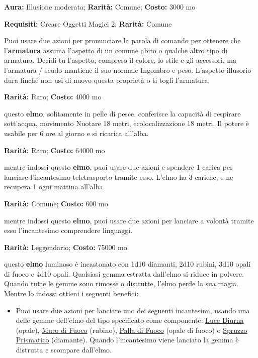 \begin{multicols}{2}

\textbf{Aura:} Illusione moderata; \textbf{Rarità:} Comune; \textbf{Costo:} 3000 mo

\textbf{Requisiti:} Creare Oggetti Magici 2; \textbf{Rarità:} Comune

Puoi usare due azioni per pronunciare la parola di comando per ottenere che l'\textbf{armatura} assuma l'aspetto di un comune abito o qualche altro tipo di armatura. Decidi tu l'aspetto, compreso il colore, lo stile e gli accessori, ma l'armatura / scudo mantiene il suo normale Ingombro e peso. L'aspetto illusorio dura finché non usi di nuovo questa proprietà o ti togli l'armatura.


\textbf{Rarità:} Raro; \textbf{Costo:} 4000 mo

questo \textbf{elmo}, solitamente in pelle di pesce, conferisce la capacità di respirare sott'acqua, movimento Nuotare 18 metri, ecolocalizzazione 18 metri. Il potere è usabile per 6 ore al giorno e si ricarica all'alba.


\textbf{Rarità:} Raro; \textbf{Costo:} 64000 mo

mentre indossi questo \textbf{elmo}, puoi usare due azioni e spendere 1 carica per lanciare l'incantesimo teletrasporto tramite esso. L'elmo ha 3 cariche, e ne recupera 1 ogni mattina all'alba.


\textbf{Rarità:} Comune; \textbf{Costo:} 600 mo

mentre indossi questo \textbf{elmo}, puoi usare due azioni per lanciare a volontà tramite esso l'incantesimo comprendere linguaggi.


\textbf{Rarità:} Leggendario; \textbf{Costo:} 75000 mo

questo \textbf{elmo} luminoso è incastonato con 1d10 diamanti, 2d10 rubini, 3d10 opali di fuoco e 4d10 opali. Qualsiasi gemma estratta dall'elmo si riduce in polvere. Quando tutte le gemme sono rimosse o distrutte, l'elmo perde la sua magia. Mentre lo indossi ottieni i seguenti benefici:

\smallskip

\begin{itemize}[leftmargin=*] \setlength{\itemsep}{0pt}
\item
Puoi usare due azioni per lanciare uno dei seguenti incantesimi, usando una delle gemme dell'elmo del tipo specificato come componente: \hyperlink{Luce Diurna}{Luce Diurna} (opale), \hyperlink{Muro di Fuoco}{Muro di Fuoco} (rubino), \hyperlink{Palla di Fuoco}{Palla di Fuoco} (opale di fuoco) o \hyperlink{Spruzzo Prismatico}{Spruzzo Prismatico} (diamante). Quando l'incantesimo viene lanciato la gemma è distrutta e scompare dall'elmo.


\end{itemize}
\end{multicols}
